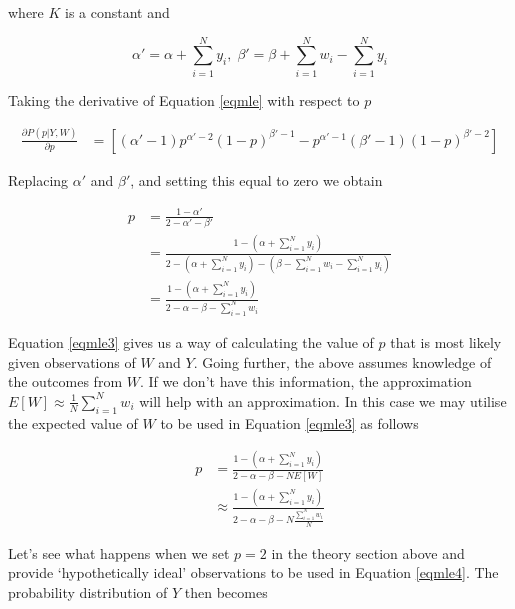 \documentclass{article}
\begin{document}
\begin{flushleft}
where $K$ is a constant and

$$\alpha' = \alpha + \sum_{i=1}^N y_i,\; \beta' = \beta + \sum_{i=1}^N w_i - \sum_{i=1}^N y_i$$

Taking the derivative of Equation \ref{eqmle} with respect to $p$

\begin{equation} \label{eqmle2}
\begin{split}
\frac{\partial P(p|Y,W)}{\partial p} & = \left[  (\alpha' - 1)p^{\alpha'-2} (1-p)^{\beta'-1} - p^{\alpha'-1}(\beta'-1)(1-p)^{\beta'-2}  \right]
\end{split}
\end{equation}

Replacing $\alpha'$ and $\beta'$, and setting this equal to zero we obtain

\begin{equation} \label{eqmle3}
\begin{split}
p &= \frac{1-\alpha'}{2-\alpha'-\beta'} \\
&= \frac{1-(\alpha + \sum_{i=1}^N y_i)}{2-(\alpha + \sum_{i=1}^N y_i)-(\beta - \sum_{i=1}^N w_i - \sum_{i=1}^N y_i)} \\
&= \frac{1-(\alpha + \sum_{i=1}^N y_i)}{2-\alpha-\beta-\sum_{i=1}^N w_i}
\end{split}
\end{equation}

Equation \ref{eqmle3} gives us a way of calculating the value of $p$ that is most likely given observations of $W$ and $Y$. Going further, the above assumes knowledge of the outcomes from $W$. If we don't have this information, the approximation $E[W] \approx \frac{1}{N}\sum_{i=1}^N w_i$ will help with an approximation. In this case we may utilise the expected value of $W$ to be used in Equation \ref{eqmle3} as follows

\begin{equation} \label{eqmle4}
\begin{split}
p &= \frac{1-(\alpha + \sum_{i=1}^N y_i)}{2-\alpha-\beta-N E[W]} \\
&\approx \frac{1-(\alpha + \sum_{i=1}^N y_i)}{2-\alpha-\beta-N \frac{\sum_{i=1}^N w_i}{N}}
\end{split}
\end{equation}

Let's see what happens when we set $p=2$ in the theory section above and provide `hypothetically ideal' observations to be used in Equation \ref{eqmle4}. The probability distribution of $Y$ then becomes


\end{flushleft}
\end{document}

